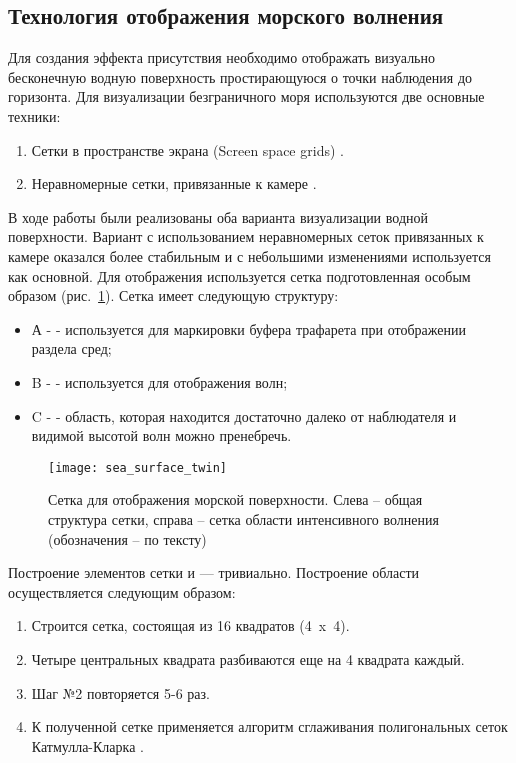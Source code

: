\subsection{Технология отображения морского волнения}

Для создания эффекта присутствия необходимо отображать визуально бесконечную водную поверхность простирающуюся о точки наблюдения до горизонта. Для визуализации безграничного моря используются две основные техники:

\begin{enumerate}
	\item	Сетки в пространстве экрана (Screen space grids) \citep{projgrid}.
	\item	Неравномерные сетки, привязанные к камере \cite{crysis}.
\end{enumerate}

В ходе работы были реализованы оба варианта визуализации водной поверхности. Вариант с использованием неравномерных сеток привязанных к камере оказался более стабильным и с небольшими изменениями используется как основной.
Для отображения используется сетка подготовленная особым образом (рис.~\ref{sea_surface_twin}). Сетка имеет следующую структуру: 

\begin{itemize}
	\item	А -  - используется для маркировки буфера трафарета при отображении раздела сред; 
	\item	B -  - используется для отображения волн; 
	\item	C -  - область, которая находится достаточно далеко от наблюдателя и видимой высотой волн можно пренебречь.
\end{itemize}

\begin{figure}[ht]
\begin{center}
\texttt{[image: sea\_surface\_twin]}
\end{center}
\caption{Сетка для отображения морской поверхности. Слева – общая структура сетки, справа – сетка области интенсивного волнения (обозначения – по тексту)}
\label{sea_surface_twin}
\end{figure}

Построение элементов сетки  и  --- тривиально. Построение области  осуществляется следующим образом:
\begin{enumerate}
	\item	Строится сетка, состоящая из 16 квадратов (4~x~4).
	\item	Четыре центральных квадрата разбиваются еще на 4 квадрата каждый.
	\item	Шаг №2 повторяется 5-6 раз.
	\item 	К полученной сетке применяется алгоритм сглаживания полигональных сеток Катмулла-Кларка \citep{catmull_clark}.
\end{enumerate}


